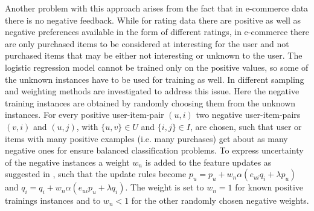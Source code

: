 \documentclass[10pt]{reportMaster}
\begin{document}
Another problem with this approach arises from the fact that in e-commerce data there is no negative feedback.
While for rating data there are positive as well as negative preferences available in the form of different ratings, in e-commerce there are only purchased items to be considered at interesting for the user and not purchased items that may be either not interesting or unknown to the user.
The logistic regression model cannot be trained only on the positive values, so some of the unknown instances have to be used for training as well.
In \cite{occf} different sampling and weighting methods are investigated to address this issue.
Here the negative training instances are obtained by randomly choosing them from the unknown instances.
For every positive user-item-pair $(u, i)$ two negative user-item-pairs $(v, i)$ and $(u,j)$, with $\{u, v\} \in U$ and $\{i, j\} \in I$, are chosen, such that user or items with many positive examples (i.e. many purchases) get about as many negative ones for ensure balanced classification problems. %
To express uncertainty of the negative instances a weight $w_n$ is added to the feature updates as suggested in \cite{occf}, such that the update rules become $p_u = p_u + w_n \alpha (e_{ui} q_i + \lambda p_u)$ and $q_i = q_i + w_n \alpha (e_{ui} p_u + \lambda q_i)$. %
The weight is set to $w_n = 1$ for known positive trainings instances and to $w_n < 1$ for the other randomly chosen negative weights. %





\end{document}
